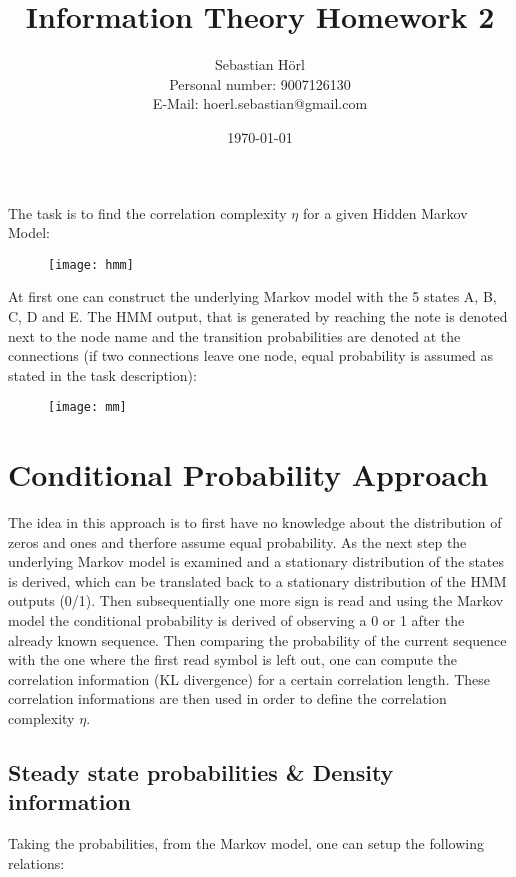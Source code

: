 \documentclass[12pt]{scrartcl}
\title{Information Theory Homework 2}
\author{Sebastian Hörl\\Personal number: 9007126130\\E-Mail: hoerl.sebastian@gmail.com}
\date{\today}
\begin{document}
\maketitle

The task is to find the correlation complexity $\eta$ for a given Hidden Markov Model:

\begin{figure}[!h]
\centering
\texttt{[image: hmm]}
\end{figure}

At first one can construct the underlying Markov model with the 5 states A, B, C, D and E. The HMM output, that is generated by reaching the note is denoted next to the node name and the transition probabilities are denoted at the connections (if two connections leave one node, equal probability is assumed as stated in the task description):

\begin{figure}[!h]
\centering
\texttt{[image: mm]}
\end{figure}

\pagebreak
\section{Conditional Probability Approach}

The idea in this approach is to first have no knowledge about the distribution of zeros and ones and therfore assume equal probability. As the next step the underlying Markov model is examined and a stationary distribution of the states is derived, which can be translated back to a stationary distribution of the HMM outputs (0/1). Then subsequentially one more sign is read and using the Markov model the conditional probability is derived of observing a 0 or 1 after the already known sequence. Then comparing the probability of the current sequence with the one where the first read symbol is left out, one can compute the correlation information (KL divergence) for a certain correlation length. These correlation informations are then used in order to define the correlation complexity $\eta$.


\subsection{Steady state probabilities \& Density information}

Taking the probabilities, from the Markov model, one can setup the following relations:
\end{document}
